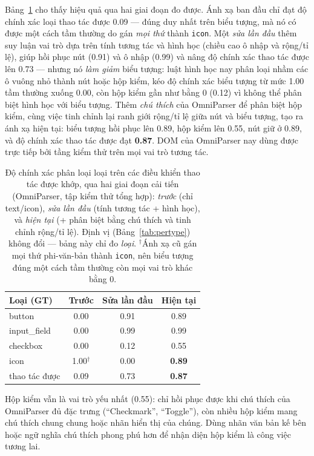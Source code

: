 \documentclass[11pt,a4paper]{article}
\newcommand{\code}[1]{\texttt{#1}}
\begin{document}
Bảng~\ref{tab:typeacc} cho thấy hiệu quả qua hai giai đoạn đo được. Ánh xạ ban đầu
chỉ đạt độ chính xác loại thao tác được 0.09 --- đúng duy nhất trên biểu tượng, mà nó
có được một cách tầm thường do gán \emph{mọi thứ} thành \code{icon}. Một \emph{sửa lần
đầu} thêm suy luận vai trò dựa trên tính tương tác và hình học (chiều cao ô nhập và
rộng/tỉ lệ), giúp hồi phục nút (0.91) và ô nhập (0.99) và nâng độ chính xác thao tác
được lên 0.73 --- nhưng nó \emph{làm giảm} biểu tượng: luật hình học nay phân loại nhầm
các ô vuông nhỏ thành nút hoặc hộp kiểm, kéo độ chính xác biểu tượng từ mức 1.00 tầm
thường xuống 0.00, còn hộp kiểm gần như bằng 0 (0.12) vì không thể phân biệt hình học
với biểu tượng. Thêm \emph{chú thích} của OmniParser để phân biệt hộp kiểm, cùng việc
tinh chỉnh lại ranh giới rộng/tỉ lệ giữa nút và biểu tượng, tạo ra ánh xạ hiện tại:
biểu tượng hồi phục lên 0.89, hộp kiểm lên 0.55, nút giữ ở 0.89, và độ chính xác thao
tác được đạt \textbf{0.87}. DOM của OmniParser nay dùng được trực tiếp bởi tầng kiểm
thử trên mọi vai trò tương tác.

\begin{table}[H]
  \centering
  \caption{Độ chính xác phân loại loại trên các điều khiển thao tác được khớp, qua hai
  giai đoạn cải tiến (OmniParser, tập kiểm thử tổng hợp): \emph{trước} (chỉ text/icon),
  \emph{sửa lần đầu} (tính tương tác + hình học), và \emph{hiện tại} (+ phân biệt bằng
  chú thích và tinh chỉnh rộng/tỉ lệ). Định vị (Bảng~\ref{tab:pertype}) không đổi ---
  bảng này chỉ đo \emph{loại}. $^\dagger$Ánh xạ cũ gán mọi thứ phi-văn-bản thành
  \code{icon}, nên biểu tượng đúng một cách tầm thường còn mọi vai trò khác bằng 0.}
  \label{tab:typeacc}
  \begin{tabular}{lccc}
    \toprule
    Loại (GT) & Trước & Sửa lần đầu & Hiện tại \\
    \midrule
    button       & 0.00 & 0.91 & 0.89 \\
    input\_field & 0.00 & 0.99 & 0.99 \\
    checkbox     & 0.00 & 0.12 & 0.55 \\
    icon         & 1.00$^\dagger$ & 0.00 & \textbf{0.89} \\
    \midrule
    thao tác được & 0.09 & 0.73 & \textbf{0.87} \\
    \bottomrule
  \end{tabular}
\end{table}

Hộp kiểm vẫn là vai trò yếu nhất (0.55): chỉ hồi phục được khi chú thích của
OmniParser đủ đặc trưng (``Checkmark'', ``Toggle''), còn nhiều hộp kiểm mang chú
thích chung chung hoặc nhãn hiển thị của chúng. Dùng nhãn văn bản kế bên hoặc ngữ
nghĩa chú thích phong phú hơn để nhận diện hộp kiểm là công việc tương lai.
\end{document}
